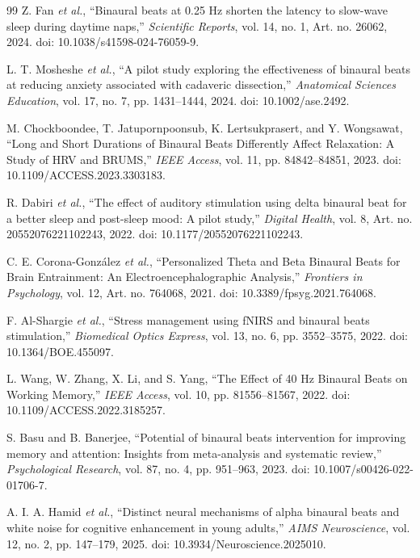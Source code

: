 \documentclass[12pt, a4paper]{report}
\begin{document}
\begin{thebibliography}{99}
Z. Fan \textit{et al.}, ``Binaural beats at 0.25 Hz shorten the latency to slow-wave sleep during daytime naps,'' \textit{Scientific Reports}, vol. 14, no. 1, Art. no. 26062, 2024. doi: 10.1038/s41598-024-76059-9.

L. T. Mosheshe \textit{et al.}, ``A pilot study exploring the effectiveness of binaural beats at reducing anxiety associated with cadaveric dissection,'' \textit{Anatomical Sciences Education}, vol. 17, no. 7, pp. 1431--1444, 2024. doi: 10.1002/ase.2492.

M. Chockboondee, T. Jatupornpoonsub, K. Lertsukprasert, and Y. Wongsawat, ``Long and Short Durations of Binaural Beats Differently Affect Relaxation: A Study of HRV and BRUMS,'' \textit{IEEE Access}, vol. 11, pp. 84842--84851, 2023. doi: 10.1109/ACCESS.2023.3303183.

R. Dabiri \textit{et al.}, ``The effect of auditory stimulation using delta binaural beat for a better sleep and post-sleep mood: A pilot study,'' \textit{Digital Health}, vol. 8, Art. no. 20552076221102243, 2022. doi: 10.1177/20552076221102243.

C. E. Corona-Gonz\'alez \textit{et al.}, ``Personalized Theta and Beta Binaural Beats for Brain Entrainment: An Electroencephalographic Analysis,'' \textit{Frontiers in Psychology}, vol. 12, Art. no. 764068, 2021. doi: 10.3389/fpsyg.2021.764068.

F. Al-Shargie \textit{et al.}, ``Stress management using fNIRS and binaural beats stimulation,'' \textit{Biomedical Optics Express}, vol. 13, no. 6, pp. 3552--3575, 2022. doi: 10.1364/BOE.455097.

L. Wang, W. Zhang, X. Li, and S. Yang, ``The Effect of 40 Hz Binaural Beats on Working Memory,'' \textit{IEEE Access}, vol. 10, pp. 81556--81567, 2022. doi: 10.1109/ACCESS.2022.3185257.

S. Basu and B. Banerjee, ``Potential of binaural beats intervention for improving memory and attention: Insights from meta-analysis and systematic review,'' \textit{Psychological Research}, vol. 87, no. 4, pp. 951--963, 2023. doi: 10.1007/s00426-022-01706-7.

A. I. A. Hamid \textit{et al.}, ``Distinct neural mechanisms of alpha binaural beats and white noise for cognitive enhancement in young adults,'' \textit{AIMS Neuroscience}, vol. 12, no. 2, pp. 147--179, 2025. doi: 10.3934/Neuroscience.2025010.


\end{thebibliography}
\end{document}
